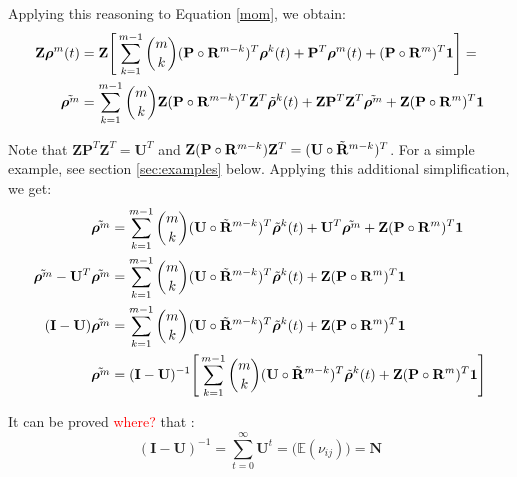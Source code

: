 \documentclass[\main/main.tex]{subfiles}
\begin{document}
Applying this reasoning to Equation \ref{mom}, we obtain:
\begin{equation}\label{mom2}
\begin{split}
     \mathbf{Z}\bm{\rho}^m(t) &= \mathbf{Z} \Bigg[ 
     \sum_{k=1}^{m-1} {m \choose k} (\mathbf{P} \circ \mathbf{R}^{m-k}) ^ T \bm{\rho}^k(t) +
     \mathbf{P} ^ T \bm{\rho}^m(t) + (\mathbf{P} \circ \mathbf{R}^{m}) ^ T \bm{1}\Bigg] = \\
     \Tilde{\bm{\rho}^m} &= \sum_{k=1}^{m-1} {m \choose k}\mathbf{Z}  (\mathbf{P} \circ \mathbf{R}^{m-k}) ^ T\mathbf{Z}^T \Tilde{\bm{\rho}}^k(t) + \mathbf{Z} \mathbf{P}^T \mathbf{Z}^T \Tilde{\bm{\rho}^m}  + \mathbf{Z} (\mathbf{P} \circ \mathbf{R}^{m}) ^ T \bm{1}
\end{split}
    \end{equation}
    
    
Note that $\mathbf{Z} \mathbf{P}^T \mathbf{Z}^T = \mathbf{U}^T $ and $ \mathbf{Z} (\mathbf{P} \circ \mathbf{R}^{m-k})\mathbf{Z}^T  = (\mathbf{U} \circ \Tilde{\mathbf{R}}^{m-k}) ^T $. For a simple example, see section \ref{sec:examples} below. Applying this additional simplification, we get:
\begin{equation}\label{mom2}
\begin{split}
     \Tilde{\bm{\rho}^m} &= \sum_{k=1}^{m-1} {m \choose k}(\mathbf{U} \circ \Tilde{\mathbf{R}}^{m-k}) ^T \Tilde{\bm{\rho}}^k(t) + \mathbf{U}^T \Tilde{\bm{\rho}^m}  + \mathbf{Z} (\mathbf{P} \circ \mathbf{R}^{m}) ^ T \bm{1}\\
     \Tilde{\bm{\rho}^m} -\mathbf{U}^T \Tilde{\bm{\rho}^m} &= \sum_{k=1}^{m-1} {m \choose k}(\mathbf{U} \circ \Tilde{\mathbf{R}}^{m-k}) ^T \Tilde{\bm{\rho}}^k(t) + \mathbf{Z} (\mathbf{P} \circ \mathbf{R}^{m}) ^ T \bm{1}  \\
     (\mathbf{I} - \mathbf{U}) \Tilde{\bm{\rho}^m} &= \sum_{k=1}^{m-1} {m \choose k}(\mathbf{U} \circ \Tilde{\mathbf{R}}^{m-k}) ^T \Tilde{\bm{\rho}}^k(t) + \mathbf{Z} (\mathbf{P} \circ \mathbf{R}^{m}) ^ T \bm{1}  \\
     \Tilde{\bm{\rho}^m} &= (\mathbf{I} - \mathbf{U})^{-1} \Bigg[ \sum_{k=1}^{m-1} {m \choose k}(\mathbf{U} \circ \Tilde{\mathbf{R}}^{m-k}) ^T \Tilde{\bm{\rho}}^k(t) + \mathbf{Z} (\mathbf{P} \circ \mathbf{R}^{m}) ^ T \bm{1} \Bigg]
\end{split}
    \end{equation}

It can be proved \textcolor{red}{where?} that \citep{Caswell2009}:
\begin{equation}
    (\mathbf{I} - \mathbf{U})^{-1} = \sum_{t=0}^\infty \mathbf{U}^t = \big( \mathds{E} (\nu_{ij}) \big) = \mathbf{N}
\end{equation}
\end{document}
